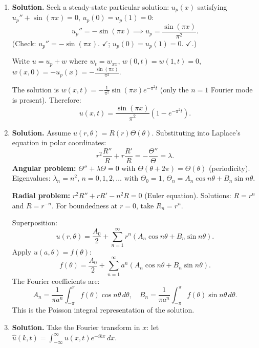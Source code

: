 \begin{enumerate}
\[
w(x,t)=\sum_{n=1}^{\infty}B_n\sin\!\left(\frac{n\pi x}{L}\right)e^{-(n\pi/L)^2 t},
\]
where $B_n=\frac{2}{L}\int_0^L [-v(x)]\sin(n\pi x/L)\,dx = -\frac{2}{L}\int_0^L v(x)\sin(n\pi x/L)\,dx$.

\[
\boxed{u(x,t)=v(x)+\sum_{n=1}^{\infty}B_n\sin\!\left(\frac{n\pi x}{L}\right)e^{-(n\pi/L)^2 t}},
\]
with $v(x)$ as above and $B_n=-\frac{2}{L}\int_0^L v(x)\sin(n\pi x/L)\,dx$.

\item \textbf{Solution.}
Seek a steady-state particular solution: $u_p(x)$ satisfying $u_p''+\sin(\pi x)=0$, $u_p(0)=u_p(1)=0$:
\[
u_p''=-\sin(\pi x)\implies u_p = \frac{\sin(\pi x)}{\pi^2}.
\]
(Check: $u_p''=-\sin(\pi x)$. $\checkmark$; $u_p(0)=u_p(1)=0$. $\checkmark$.)

Write $u=u_p+w$ where $w_t=w_{xx}$, $w(0,t)=w(1,t)=0$, $w(x,0)=-u_p(x)=-\frac{\sin(\pi x)}{\pi^2}$.

The solution is $w(x,t)=-\frac{1}{\pi^2}\sin(\pi x)e^{-\pi^2 t}$ (only the $n=1$ Fourier mode is present). Therefore:
\[
\boxed{u(x,t)=\frac{\sin(\pi x)}{\pi^2}\left(1-e^{-\pi^2 t}\right)}.
\]

\item \textbf{Solution.}
Assume $u(r,\theta)=R(r)\Theta(\theta)$. Substituting into Laplace's equation in polar coordinates:
\[
r^2\frac{R''}{R}+r\frac{R'}{R}=-\frac{\Theta''}{\Theta}=\lambda.
\]
\textbf{Angular problem:} $\Theta''+\lambda\Theta=0$ with $\Theta(\theta+2\pi)=\Theta(\theta)$ (periodicity). Eigenvalues: $\lambda_n=n^2$, $n=0,1,2,\ldots$ with $\Theta_0=1$, $\Theta_n=A_n\cos n\theta+B_n\sin n\theta$.

\textbf{Radial problem:} $r^2R''+rR'-n^2R=0$ (Euler equation). Solutions: $R=r^n$ and $R=r^{-n}$. For boundedness at $r=0$, take $R_n=r^n$.

Superposition:
\[
u(r,\theta)=\frac{A_0}{2}+\sum_{n=1}^{\infty}r^n(A_n\cos n\theta+B_n\sin n\theta).
\]
Apply $u(a,\theta)=f(\theta)$:
\[
f(\theta)=\frac{A_0}{2}+\sum_{n=1}^{\infty}a^n(A_n\cos n\theta+B_n\sin n\theta).
\]
The Fourier coefficients are:
\[
\boxed{A_n = \frac{1}{\pi a^n}\int_{-\pi}^{\pi}f(\theta)\cos n\theta\,d\theta, \quad B_n = \frac{1}{\pi a^n}\int_{-\pi}^{\pi}f(\theta)\sin n\theta\,d\theta}.
\]
This is the Poisson integral representation of the solution.

\item \textbf{Solution.}
Take the Fourier transform in $x$: let $\hat{u}(k,t)=\int_{-\infty}^{\infty}u(x,t)e^{-ikx}\,dx$.


\end{enumerate}
